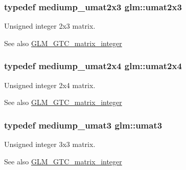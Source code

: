 \subsubsection[{\texorpdfstring{umat2x3}{umat2x3}}]{\setlength{\rightskip}{0pt plus 5cm}typedef mediump\+\_\+umat2x3 {\bf glm\+::umat2x3}}\hypertarget{group__gtc__matrix__integer_ga890ae28f9230794138b2c89f44ce3376}{}\label{group__gtc__matrix__integer_ga890ae28f9230794138b2c89f44ce3376}
Unsigned integer 2x3 matrix. \begin{DoxySeeAlso}{See also}
\hyperlink{group__gtc__matrix__integer}{G\+L\+M\+\_\+\+G\+T\+C\+\_\+matrix\+\_\+integer} 
\end{DoxySeeAlso}
\subsubsection[{\texorpdfstring{umat2x4}{umat2x4}}]{\setlength{\rightskip}{0pt plus 5cm}typedef mediump\+\_\+umat2x4 {\bf glm\+::umat2x4}}\hypertarget{group__gtc__matrix__integer_ga3b23b164240cf4dfb429776da7be9d88}{}\label{group__gtc__matrix__integer_ga3b23b164240cf4dfb429776da7be9d88}
Unsigned integer 2x4 matrix. \begin{DoxySeeAlso}{See also}
\hyperlink{group__gtc__matrix__integer}{G\+L\+M\+\_\+\+G\+T\+C\+\_\+matrix\+\_\+integer} 
\end{DoxySeeAlso}
\subsubsection[{\texorpdfstring{umat3}{umat3}}]{\setlength{\rightskip}{0pt plus 5cm}typedef mediump\+\_\+umat3 {\bf glm\+::umat3}}\hypertarget{group__gtc__matrix__integer_ga8b8fbc858e28abf8fc344744f8d6d368}{}\label{group__gtc__matrix__integer_ga8b8fbc858e28abf8fc344744f8d6d368}
Unsigned integer 3x3 matrix. \begin{DoxySeeAlso}{See also}
\hyperlink{group__gtc__matrix__integer}{G\+L\+M\+\_\+\+G\+T\+C\+\_\+matrix\+\_\+integer} 
\end{DoxySeeAlso}
